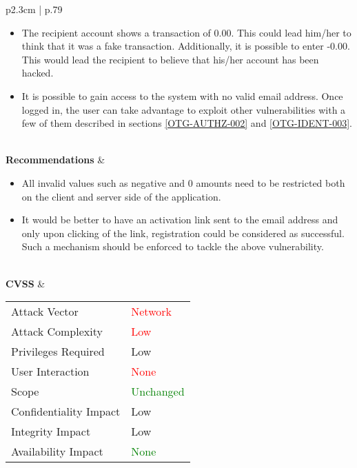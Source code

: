 \begin{longtable}[l]{ p{2.3cm} | p{.79\linewidth} }
\begin{itemize}
            \item The recipient account shows a transaction of 0.00. This could lead him/her to think that it was a fake transaction. Additionally, it is possible to enter -0.00. This would lead the recipient to believe that his/her account has been hacked.
            \item It is possible to gain access to the system with no valid email address. Once logged in, the user can take advantage to exploit other vulnerabilities with a few of them described in sections \ref{OTG-AUTHZ-002} and \ref{OTG-IDENT-003}.
        \end{itemize}
    \\
    \textbf{Recommen\-dations} &
        \begin{itemize}
        \item All invalid values such as negative and 0 amounts need to be restricted both on the client and server side of the application.
        \item It would be better to have an activation link sent to the email address and only upon clicking of the link, registration could be considered as successful. Such a mechanism should be enforced to tackle the above vulnerability.
        \end{itemize}
    \\ \hline
    \textbf{CVSS} &
        \begin{tabular}[t]{@{}l | l}
            Attack Vector           & \textcolor{red}{Network} \\
            Attack Complexity       & \textcolor{red}{Low} \\
            Privileges Required     & \textcolor{BurntOrange}{Low} \\
            User Interaction        & \textcolor{red}{None} \\
            Scope                   & \textcolor{Green}{Unchanged} \\
            Confidentiality Impact  & \textcolor{BurntOrange}{Low} \\
            Integrity Impact        & \textcolor{BurntOrange}{Low} \\
            Availability Impact     & \textcolor{Green}{None}
        \end{tabular}
    \\ \hline
\end{longtable}
\clearpage

